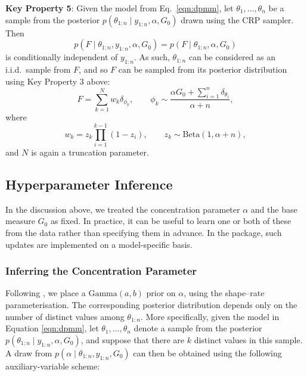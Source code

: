 \documentclass[nojss]{jss}
\begin{document}
\begin{tcolorbox}
\textbf{Key Property 5}: Given the model from Eq.\ \eqref{eqn:dpmm}, let $\theta_1, \ldots, \theta_n$ be a sample from
the posterior $p(\theta_{1:n} \mid y_{1:n}, \alpha, G_0)$ drawn using the CRP sampler. Then
\[
p(F \mid \theta_{1:n}, y_{1:n}, \alpha, G_0) = p(F \mid \theta_{1:n}, \alpha, G_0)
\]
is conditionally independent of $y_{1:n}$. As such,
$\theta_{1:n}$ can be considered as an i.i.d.\ sample from $F$, and so $F$ can be sampled from its
posterior distribution using Key Property 3 above:
\[
F = \sum_{k=1}^N w_k \delta_{\phi_k}, \qquad
\phi_k \sim \frac{\alpha G_0 + \sum_{i=1}^n \delta_{\theta_i}}{\alpha + n},
\]
where
\[
w_k = z_k \prod_{i=1}^{k-1}(1-z_i), \qquad z_k \sim \text{Beta}(1, \alpha + n),
\]
and $N$ is again a truncation parameter.
\end{tcolorbox}







\subsection{Hyperparameter Inference} \label{subsec:hyperparam}

In the discussion above, we treated the concentration parameter $\alpha$ and the base measure $G_0$ as fixed. In practice, it can be useful to learn one or both of these from the data rather than specifying them in advance. In the  package, such updates are implemented on a model-specific basis.

\subsubsection{Inferring the Concentration Parameter}\label{subsubsec:concentration}

Following \cite{west_hyperparameter_1992}, we place a $\text{Gamma}(a,b)$ prior on $\alpha$, using the shape--rate parameterisation. The corresponding posterior distribution depends only on the number of distinct values among $\theta_{1:n}$. More specifically, given the model in Equation \eqref{eqn:dpmm}, let $\theta_1,\ldots,\theta_n$ denote a sample from the posterior $p(\theta_{1:n} \mid y_{1:n}, \alpha, G_0)$, and suppose that there are $k$ distinct values in this sample. A draw from $p(\alpha \mid \theta_{1:n}, y_{1:n}, G_0)$ can then be obtained using the following auxiliary-variable scheme:
\end{document}
